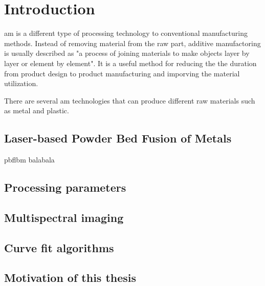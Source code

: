 \glsresetall%
\chapter{Introduction}%

\gls{am} is a different type of processing technology to conventional 
manufacturing methods. Instead of removing material from the raw part, 
additive manufactoring is usually described as "a process of joining materials
to make objects layer by layer or element by element"\cite{Frazier.2014}.
It is a useful method for reducing the the duration from product design 
to product manufacturing and imporving the material 
utilization\cite{Swift.2013b}. 


There are several \gls{am} technologies that can produce different raw materials 
such as metal and plastic.
%
%
\section{Laser-based Powder Bed Fusion of Metals}%
\gls{pbflbm} balabala
%
%
\section{Processing parameters}

\section{Multispectral imaging}

\section{Curve fit algorithms}

\section{Motivation of this thesis}